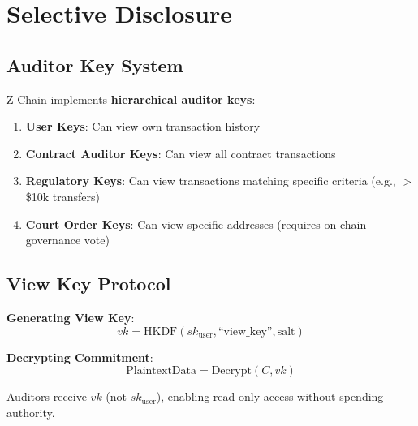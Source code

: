 \section{Selective Disclosure}


\subsection{Auditor Key System}

Z-Chain implements \textbf{hierarchical auditor keys}:

\begin{enumerate}
  \item \textbf{User Keys}: Can view own transaction history
  \item \textbf{Contract Auditor Keys}: Can view all contract transactions
  \item \textbf{Regulatory Keys}: Can view transactions matching specific criteria (e.g., $>$ \$10k transfers)
  \item \textbf{Court Order Keys}: Can view specific addresses (requires on-chain governance vote)
\end{enumerate}

\subsection{View Key Protocol}

\textbf{Generating View Key}:
\begin{equation}
vk = \text{HKDF}(sk_{\text{user}}, \text{``view\_key''}, \text{salt})
\end{equation}

\textbf{Decrypting Commitment}:
\begin{equation}
\text{PlaintextData} = \text{Decrypt}(C, vk)
\end{equation}

Auditors receive $vk$ (not $sk_{\text{user}}$), enabling read-only access without spending authority.

